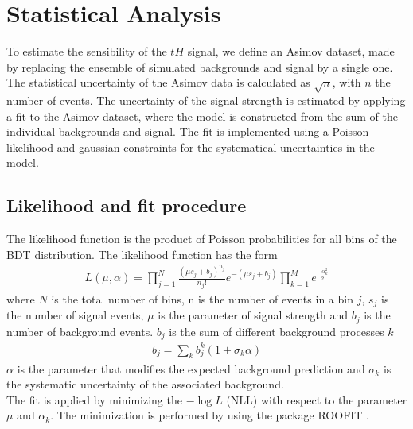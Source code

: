\chapter{Statistical Analysis}
To estimate the sensibility of the $tH$ signal, we define an Asimov dataset, made by replacing the ensemble of simulated backgrounds and signal by a single one. The statistical uncertainty of the Asimov data is calculated as $\sqrt{n}$, with $n$ the number of events. The uncertainty of the signal strength is estimated by applying a  fit to the Asimov dataset, where the model
is constructed from the sum of the individual backgrounds and signal. The fit is implemented using a Poisson likelihood and gaussian constraints for the systematical uncertainties in the model.


\section{Likelihood and fit procedure}
The likelihood function is the product of Poisson probabilities for all bins of the BDT distribution. The likelihood function has the form
\begin{align}
L(\mu,\alpha)=\prod_{j=1}^{N}\frac{(\mu s_j +b_j)^{n_j}}{n_j !}e^{-(\mu s_j+b_j)} \prod_{k=1}^M e^{\frac{-\alpha^2_k}{2}}
\end{align}
where $N$ is the total number of bins, n is the number of events in a bin $j$,  $s_j$ is the number of signal events, $\mu$ is the parameter of signal strength and  $b_j$ is the number of background events.
$b_j$ is the sum of different background processes $k$
\begin{align}
b_j=\sum_k b_j^k(1+\sigma_k \alpha)
\end{align}
$\alpha$ is the parameter that modifies the expected background prediction and $\sigma_k$ is the systematic uncertainty of the associated background. \\

The fit is applied by minimizing the $-\log{L}$ (NLL) with respect to the parameter $\mu$ and $\alpha_k$. The minimization is performed by using the package ROOFIT \cite{roofit}.
\pagebreak

